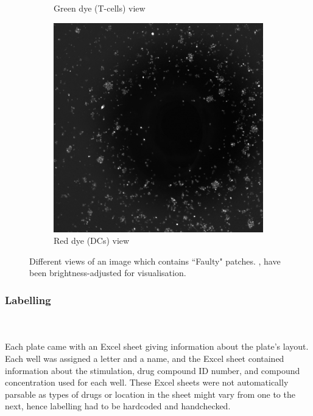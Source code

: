 \begin{figure}[h!]
\begin{subfigure}[h!]{0.3\textwidth}
        \caption{Green dye (T-cells) view}
        \label{subfig:tcell}
    \end{subfigure}
    \begin{subfigure}[h!]{0.3\textwidth}
        \includegraphics[width=\textwidth]{dissertation/figures/faulty_dcell.jpg}
        \caption{Red dye (DCs) view}
        \label{subfig:dc}
    \end{subfigure}
    \caption{Different views of an image which contains ``Faulty" patches. \protect{}, \protect{} have been brightness-adjusted for visualisation.}
    \label{fig:noisyimage}
\end{figure}

\bigskip
\subsubsection{Labelling}

\hfill\\
\hfill\\
Each plate came with an Excel sheet giving information about the plate's layout. Each well was assigned a letter and a name, and the Excel sheet contained information about the stimulation, drug compound ID number, and compound concentration used for each well. These Excel sheets were not automatically parsable as types of drugs or location in the sheet might vary from one to the next, hence labelling had to be hardcoded and handchecked.

